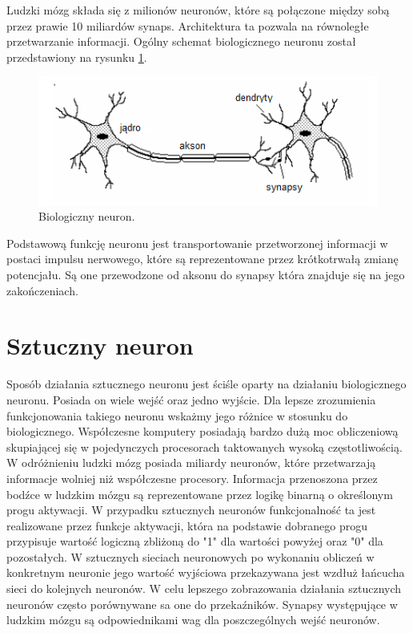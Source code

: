 Ludzki mózg składa się z milionów neuronów, które są połączone między sobą przez prawie 10 miliardów synaps. Architektura ta pozwala na równoległe przetwarzanie informacji. Ogólny schemat biologicznego neuronu został przedstawiony na rysunku \ref{fig:bio_neuron}.

\begin{figure}[!htbp]
\centering
\includegraphics[width=1\linewidth]{./include/bio_neuron}
\caption{Biologiczny neuron.}
\label{fig:bio_neuron}
\end{figure}

Podstawową funkcję neuronu jest transportowanie przetworzonej informacji w postaci impulsu nerwowego, które są reprezentowane przez krótkotrwałą zmianę potencjału. Są one przewodzone od aksonu do synapsy która znajduje się na jego zakończeniach. 

\section{Sztuczny neuron}
Sposób działania sztucznego neuronu jest ściśle oparty na działaniu biologicznego neuronu. Posiada on wiele wejść oraz jedno wyjście. Dla lepsze zrozumienia funkcjonowania takiego neuronu wskażmy jego różnice w stosunku do biologicznego. %
Współczesne komputery posiadają bardzo dużą moc obliczeniową skupiającej się w pojedynczych procesorach taktowanych wysoką częstotliwością. W odróżnieniu ludzki mózg posiada miliardy neuronów, które przetwarzają informacje wolniej niż współczesne procesory. Informacja przenoszona przez bodźce w ludzkim mózgu są reprezentowane przez logikę binarną o określonym progu aktywacji. W przypadku sztucznych neuronów funkcjonalność ta jest realizowane przez funkcje aktywacji, która na podstawie dobranego progu przypisuje wartość logiczną zbliżoną do "1" dla wartości powyżej oraz "0" dla pozostałych. W sztucznych sieciach neuronowych po wykonaniu obliczeń w konkretnym neuronie jego wartość wyjściowa przekazywana jest wzdłuż łańcucha sieci do kolejnych neuronów. 
W celu lepszego zobrazowania działania sztucznych neuronów często porównywane sa one do przekaźników. Synapsy występujące w ludzkim mózgu są odpowiednikami wag dla poszczególnych wejść neuronów.

